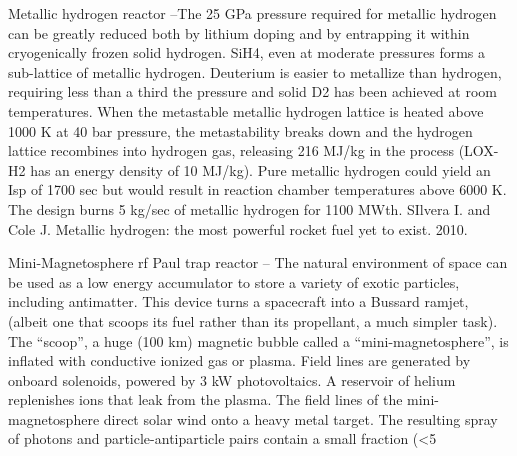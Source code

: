 \documentclass[a4paper]{book}
\begin{document}
Metallic hydrogen reactor –The 25 GPa pressure required for metallic hydrogen can be greatly reduced both by lithium doping and by entrapping it within cryogenically frozen solid hydrogen.  SiH4, even at moderate pressures forms a sub-lattice of metallic hydrogen.  Deuterium is easier to metallize than hydrogen, requiring less than a third the pressure and solid D2 has been achieved at room temperatures. When the metastable metallic hydrogen lattice is heated above 1000 K at 40 bar pressure, the metastability breaks down and the hydrogen lattice recombines into hydrogen gas, releasing 216 MJ/kg in the process (LOX-H2 has an energy density of 10 MJ/kg).  Pure metallic hydrogen could yield an Isp of 1700 sec but would result in reaction chamber temperatures above 6000 K.  The design burns 5 kg/sec of metallic hydrogen for 1100 MWth.
SIlvera I. and Cole J. Metallic hydrogen: the most powerful rocket fuel yet to exist. 2010.
 
Mini-Magnetosphere rf Paul trap reactor – The natural environment of space can be used as a low energy accumulator to store a variety of exotic particles, including antimatter. This device turns a spacecraft into a Bussard ramjet, (albeit one that scoops its fuel rather than its propellant, a much simpler task).  The “scoop”, a huge (100 km) magnetic bubble called a “mini-magnetosphere”, is inflated with conductive ionized gas or plasma. Field lines are generated by onboard solenoids, powered by 3 kW photovoltaics. A reservoir of helium replenishes ions that leak from the plasma. The field lines of the mini-magnetosphere direct solar wind onto a heavy metal target. The resulting spray of photons and particle-antiparticle pairs contain a small fraction (<5%
 
\end{document}
